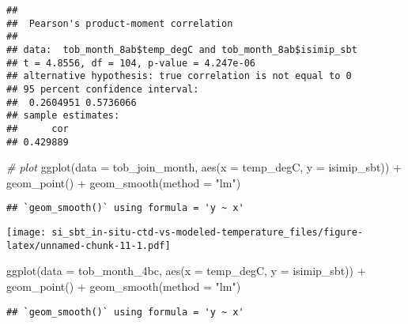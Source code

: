 \documentclass[
]{article}
\newenvironment{Shaded}{\begin{snugshade}}{\end{snugshade}}
\newcommand{\AttributeTok}[1]{\textcolor[rgb]{0.77,0.63,0.00}{#1}}
\newcommand{\CommentTok}[1]{\textcolor[rgb]{0.56,0.35,0.01}{\textit{#1}}}
\newcommand{\FunctionTok}[1]{\textcolor[rgb]{0.00,0.00,0.00}{#1}}
\newcommand{\NormalTok}[1]{#1}
\newcommand{\SpecialCharTok}[1]{\textcolor[rgb]{0.00,0.00,0.00}{#1}}
\newcommand{\StringTok}[1]{\textcolor[rgb]{0.31,0.60,0.02}{#1}}
\begin{document}
\begin{Shaded}
\end{Shaded}

\begin{verbatim}
## 
##  Pearson's product-moment correlation
## 
## data:  tob_month_8ab$temp_degC and tob_month_8ab$isimip_sbt
## t = 4.8556, df = 104, p-value = 4.247e-06
## alternative hypothesis: true correlation is not equal to 0
## 95 percent confidence interval:
##  0.2604951 0.5736066
## sample estimates:
##      cor 
## 0.429889
\end{verbatim}

\begin{Shaded}
\begin{Highlighting}[]
\CommentTok{\# plot}
\FunctionTok{ggplot}\NormalTok{(}\AttributeTok{data =}\NormalTok{ tob\_join\_month, }\FunctionTok{aes}\NormalTok{(}\AttributeTok{x =}\NormalTok{ temp\_degC, }\AttributeTok{y =}\NormalTok{ isimip\_sbt)) }\SpecialCharTok{+} \FunctionTok{geom\_point}\NormalTok{() }\SpecialCharTok{+} \FunctionTok{geom\_smooth}\NormalTok{(}\AttributeTok{method =} \StringTok{"lm"}\NormalTok{)}
\end{Highlighting}
\end{Shaded}

\begin{verbatim}
## `geom_smooth()` using formula = 'y ~ x'
\end{verbatim}

\texttt{[image: si\_sbt\_in-situ-ctd-vs-modeled-temperature\_files/figure-latex/unnamed-chunk-11-1.pdf]}

\begin{Shaded}
\begin{Highlighting}[]
\FunctionTok{ggplot}\NormalTok{(}\AttributeTok{data =}\NormalTok{ tob\_month\_4bc, }\FunctionTok{aes}\NormalTok{(}\AttributeTok{x =}\NormalTok{ temp\_degC, }\AttributeTok{y =}\NormalTok{ isimip\_sbt)) }\SpecialCharTok{+} \FunctionTok{geom\_point}\NormalTok{() }\SpecialCharTok{+} \FunctionTok{geom\_smooth}\NormalTok{(}\AttributeTok{method =} \StringTok{"lm"}\NormalTok{)}
\end{Highlighting}
\end{Shaded}

\begin{verbatim}
## `geom_smooth()` using formula = 'y ~ x'
\end{verbatim}
\end{document}
